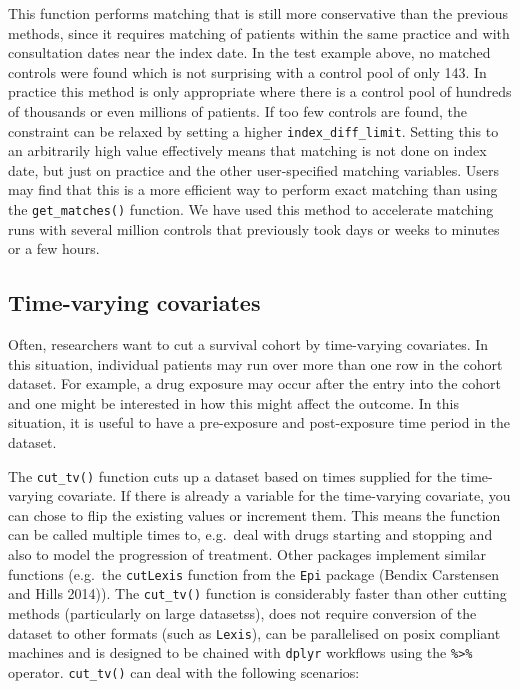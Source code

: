 \documentclass[]{article}
\begin{document}
This function performs matching that is still more conservative than the
previous methods, since it requires matching of patients within the same
practice and with consultation dates near the index date. In the test
example above, no matched controls were found which is not surprising
with a control pool of only 143. In practice this method is only
appropriate where there is a control pool of hundreds of thousands or
even millions of patients. If too few controls are found, the constraint
can be relaxed by setting a higher \texttt{index\_diff\_limit}. Setting
this to an arbitrarily high value effectively means that matching is not
done on index date, but just on practice and the other user-specified
matching variables. Users may find that this is a more efficient way to
perform exact matching than using the \texttt{get\_matches()} function.
We have used this method to accelerate matching runs with several
million controls that previously took days or weeks to minutes or a few
hours.

\subsection{Time-varying covariates}\label{time-varying-covariates}

Often, researchers want to cut a survival cohort by time-varying
covariates. In this situation, individual patients may run over more
than one row in the cohort dataset. For example, a drug exposure may
occur after the entry into the cohort and one might be interested in how
this might affect the outcome. In this situation, it is useful to have a
pre-exposure and post-exposure time period in the dataset.

The \texttt{cut\_tv()} function cuts up a dataset based on times
supplied for the time-varying covariate. If there is already a variable
for the time-varying covariate, you can chose to flip the existing
values or increment them. This means the function can be called multiple
times to, e.g.~deal with drugs starting and stopping and also to model
the progression of treatment. Other packages implement similar functions
(e.g.~the \texttt{cutLexis} function from the \texttt{Epi} package
(Bendix Carstensen and Hills 2014)). The \texttt{cut\_tv()} function is
considerably faster than other cutting methods (particularly on large
datasetss), does not require conversion of the dataset to other formats
(such as \texttt{Lexis}), can be parallelised on posix compliant
machines and is designed to be chained with \texttt{dplyr} workflows
using the \texttt{\%\textgreater{}\%} operator. \texttt{cut\_tv()} can
deal with the following scenarios:
\end{document}
